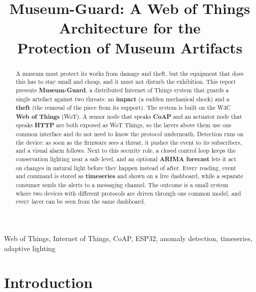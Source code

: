 \documentclass[conference]{IEEEtran}
\begin{document}
\title{Museum-Guard: A Web of Things Architecture for the\\ Protection of Museum Artifacts}
\author{
}

\maketitle

\begin{abstract}
A museum must protect its works from damage and theft, but the equipment that does this has to stay small and cheap, and it must not disturb the exhibition. This report presents \textbf{Museum-Guard}, a distributed Internet of Things system that guards a single artefact against two threats: an \textbf{impact} (a sudden mechanical shock) and a \textbf{theft} (the removal of the piece from its support). The system is built on the W3C \textbf{Web of Things} (WoT). A sensor node that speaks \textbf{CoAP} and an actuator node that speaks \textbf{HTTP} are both exposed as WoT Things, so the layers above them use one common interface and do not need to know the protocol underneath. Detection runs on the device: as soon as the firmware sees a threat, it pushes the event to its subscribers, and a visual alarm follows. Next to this security role, a closed control loop keeps the conservation lighting near a safe level, and an optional \textbf{ARIMA forecast} lets it act on changes in natural light before they happen instead of after. Every reading, event and command is stored as \textbf{timeseries} and shown on a live dashboard, while a separate consumer sends the alerts to a messaging channel. The outcome is a small system where two devices with different protocols are driven through one common model, and every layer can be seen from the same dashboard.
\end{abstract}

\begin{IEEEkeywords}
Web of Things, Internet of Things, CoAP, ESP32, anomaly detection, timeseries, adaptive lighting
\end{IEEEkeywords}

\section{Introduction}
\label{sec:introduction}
\end{document}
